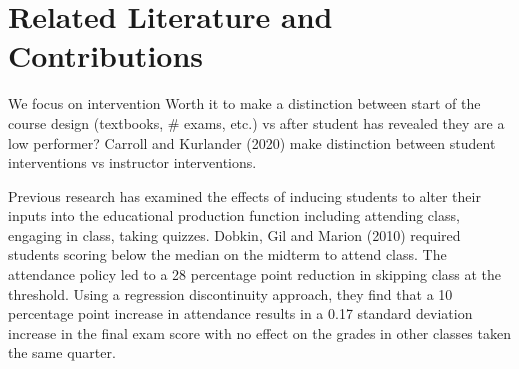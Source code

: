 \documentclass[12pt]{article}
\begin{document}




\section{Related Literature and Contributions} \label{background}

We focus on intervention Worth it to make a distinction between start of the course design (textbooks, \# exams, etc.) vs after student has revealed they are a low performer?  Carroll and Kurlander (2020) make distinction between student interventions vs instructor interventions.   

Previous research has examined the effects of inducing students to alter their inputs into the educational production function including attending class, engaging in class, taking quizzes. Dobkin, Gil and Marion (2010) required students scoring below the median on the midterm to attend class.  The attendance policy led to a 28 percentage point reduction in skipping class at the threshold.  Using a regression discontinuity approach, they find that a 10 percentage point increase in attendance results in a 0.17 standard deviation increase in the final exam score with no effect on the grades in other classes taken the same quarter. 
\end{document}
